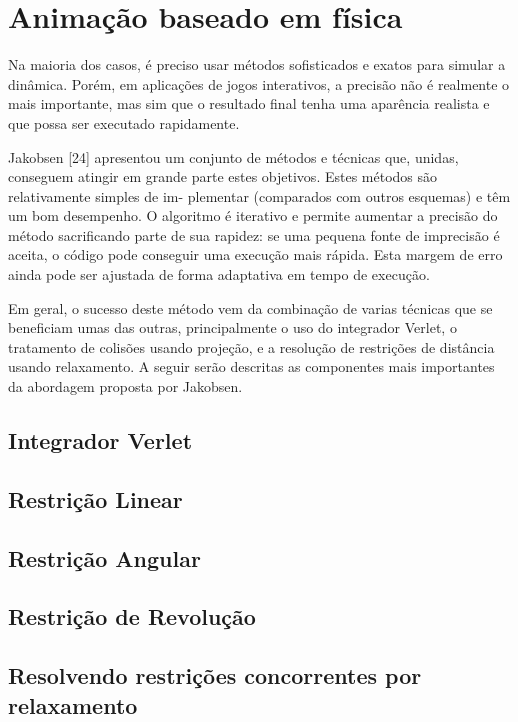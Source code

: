 \chapter{Animação baseado em física}

Na maioria dos casos, é preciso usar métodos sofisticados e exatos para simular a dinâmica. Porém, em aplicações de jogos interativos, a precisão não é realmente o mais importante, mas sim que o resultado final tenha uma aparência realista e que possa ser executado rapidamente. 

Jakobsen [24] apresentou um conjunto de métodos e técnicas que, unidas, conseguem atingir em grande parte estes objetivos. Estes métodos são relativamente simples de im-
plementar (comparados com outros esquemas) e têm um bom desempenho. O algoritmo é iterativo e permite aumentar a precisão do método sacrificando parte de sua rapidez: se
uma pequena fonte de imprecisão é aceita, o código pode conseguir uma execução mais rápida. Esta margem de erro ainda pode ser ajustada de forma adaptativa em tempo de
execução.

Em geral, o sucesso deste método vem da combinação de varias técnicas que se beneficiam umas das outras, principalmente o uso do integrador Verlet, o tratamento de colisões usando projeção, e a resolução de restrições de distância usando relaxamento. A seguir serão descritas as componentes mais importantes da abordagem proposta por Jakobsen.

\section{Integrador Verlet}

\section{Restrição Linear}

\section{Restrição Angular}

\section{Restrição de Revolução}

\section{Resolvendo restrições concorrentes por relaxamento}

